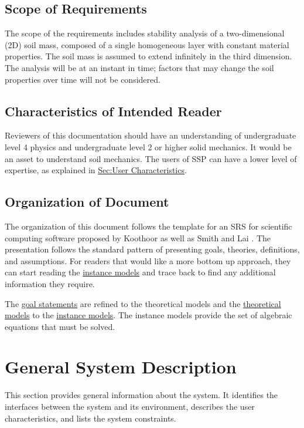 \documentclass[12pt]{article}
\begin{document}
\subsection{Scope of Requirements}
\label{Sec:ReqsScope}
The scope of the requirements includes stability analysis of a two-dimensional (2D) soil mass, composed of a single homogeneous layer with constant material properties. The soil mass is assumed to extend infinitely in the third dimension. The analysis will be at an instant in time; factors that may change the soil properties over time will not be considered.

\subsection{Characteristics of Intended Reader}
\label{Sec:ReaderChars}
Reviewers of this documentation should have an understanding of undergraduate level 4 physics and undergraduate level 2 or higher solid mechanics. It would be an asset to understand soil mechanics. The users of SSP can have a lower level of expertise, as explained in \hyperref[Sec:UserChars]{Sec:User Characteristics}.

\subsection{Organization of Document}
\label{Sec:DocOrg}
The organization of this document follows the template for an SRS for scientific computing software proposed by Koothoor \cite{koothoor2013} as well as Smith and Lai \cite{smithLai2005}. The presentation follows the standard pattern of presenting goals, theories, definitions, and assumptions. For readers that would like a more bottom up approach, they can start reading the \hyperref[Sec:IMs]{instance models} and trace back to find any additional information they require.

The \hyperref[Sec:GoalStmt]{goal statements} are refined to the theoretical models and the \hyperref[Sec:TMs]{theoretical models} to the \hyperref[Sec:IMs]{instance models}. The instance models provide the set of algebraic equations that must be solved.

\section{General System Description}
\label{Sec:GenSysDesc}
This section provides general information about the system. It identifies the interfaces between the system and its environment, describes the user characteristics, and lists the system constraints.
\end{document}

